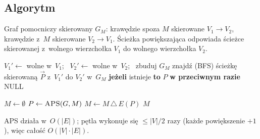 \documentclass[11pt,a4paper]{article}
\theoremstyle{plain}
\theoremstyle{definition}
\begin{document}
\subsection*{Algorytm}
Graf pomocniczy skierowany $G_M$: krawędzie spoza $M$ skierowane $V_1\!\to\!V_2$, krawędzie z~$M$
skierowane $V_2\!\to\!V_1$. Ścieżka powiększająca odpowiada ścieżce skierowanej z~wolnego wierzchołka
$V_1$ do wolnego wierzchołka $V_2$.
\begin{algorithm}[H]
\caption{APS($G,M$) --- szukanie ścieżki powiększającej}
\begin{algorithmic}[1]
\State $V_1'\gets$ wolne w~$V_1$; \ $V_2'\gets$ wolne w~$V_2$; \ zbuduj $G_M$
\State znajdź (BFS) ścieżkę skierowaną $\overrightarrow{P}$ z~$V_1'$ do $V_2'$ w~$G_M$
\State \textbf{jeżeli} istnieje \textbf{to} \Return $P$ \textbf{w przeciwnym razie} \Return NULL
\end{algorithmic}
\end{algorithm}
\begin{algorithm}[H]
\caption{MM($G$) --- maksymalne skojarzenie}
\begin{algorithmic}[1]
\State $M\gets\emptyset$
\Repeat
  \State $P\gets\textsc{APS}(G,M)$
   $M\gets M\,\triangle\,E(P)$ \EndIf
{}
\State \Return $M$
\end{algorithmic}
\end{algorithm}
APS działa w~$O(|E|)$; pętla wykonuje się $\le|V|/2$ razy (każde powiększenie $+1$), więc całość
$O(|V|\cdot|E|)$.
\end{document}
